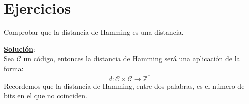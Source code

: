 %
%

\section{Ejercicios}\label{sec:EjerciciosCodBloques}

%
%
\begin{ejercicio}
Comprobar que la distancia de Hamming es una distancia.
\end{ejercicio}
\underline{\textbf{Soluci\'on}}:\\
Sea $\mathcal{C}$ un c\'odigo, entonces la distancia de Hamming ser\'a una
aplicaci\'on de la forma:
\begin{displaymath}
d:\mathcal{C}\times \mathcal{C} \longrightarrow \mathbb{Z}^{^+}
\end{displaymath}
Recordemos que la distancia de Hamming, entre dos palabras, es el n\'umero de
bits en el que no coinciden.
